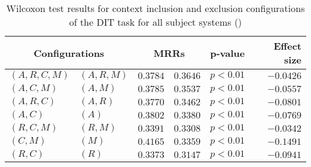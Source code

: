 
\begin{table}
\begin{spacing}{1.2}
\centering
\caption{Wilcoxon test results for context inclusion and exclusion configurations of the DIT task for all subject systems (\ctwo)}
\label{table:versus-wilcox-all-dit-context}
\begin{tabular}{ll|rr|rr}
\toprule
      \multicolumn{2}{c|}{Configurations} &                \multicolumn{2}{c|}{MRRs} &        p-value & Effect size \\
\midrule
 $(A,R,C,M)$ &  $(A,R,M)$ &  $\bm{0.3784}$ &  $0.3646$ & $p<0.01$ &   $-0.0426$ \\
   $(A,C,M)$ &    $(A,M)$ &  $\bm{0.3785}$ &  $0.3537$ & $p<0.01$ &   $-0.0557$ \\
   $(A,R,C)$ &    $(A,R)$ &  $\bm{0.3770}$ &  $0.3462$ & $p<0.01$ &   $-0.0801$ \\
     $(A,C)$ &      $(A)$ &  $\bm{0.3802}$ &  $0.3380$ & $p<0.01$ &   $-0.0769$ \\
   $(R,C,M)$ &    $(R,M)$ &  $\bm{0.3391}$ &  $0.3308$ & $p<0.01$ &   $-0.0342$ \\
     $(C,M)$ &      $(M)$ &  $\bm{0.4165}$ &  $0.3359$ & $p<0.01$ &   $-0.1491$ \\
     $(R,C)$ &      $(R)$ &  $\bm{0.3373}$ &  $0.3147$ & $p<0.01$ &   $-0.0941$ \\
\bottomrule
\end{tabular}

\end{spacing}
\end{table}

